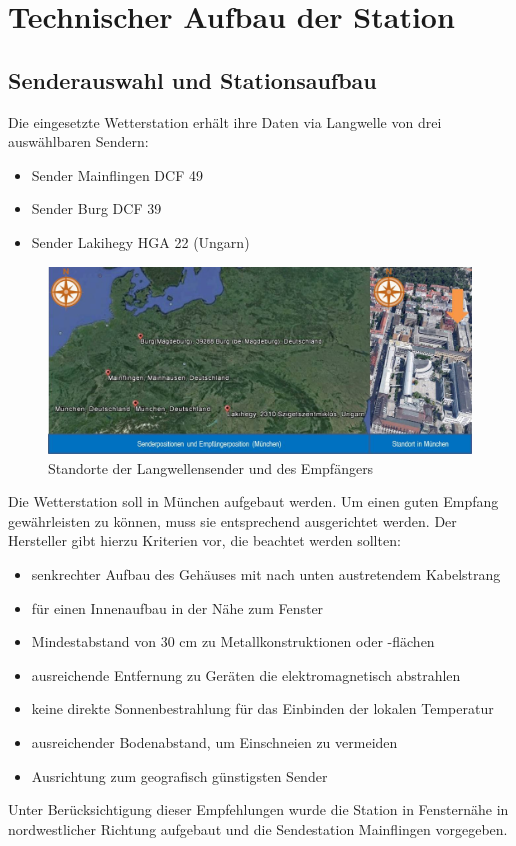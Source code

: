 \section{Technischer Aufbau der Station}
\subsection{Senderauswahl und Stationsaufbau}
Die eingesetzte Wetterstation erhält ihre Daten via Langwelle von drei auswählbaren Sendern:
\begin{itemize}
\item Sender Mainflingen DCF 49
\item Sender Burg DCF 39
\item Sender Lakihegy HGA 22 (Ungarn)
\end{itemize}
\begin{figure}[h]
\centering
\includegraphics[scale=0.65]{weatherstation/Empfaengerausrichtung}
\caption{Standorte der Langwellensender und des Empfängers\cite[S. 15]{HKWDoc}}
\label{fig:3}
\end{figure}
Die Wetterstation soll in München aufgebaut werden. Um einen guten Empfang gewährleisten zu können, muss sie entsprechend ausgerichtet werden. Der Hersteller gibt hierzu Kriterien vor, die beachtet werden sollten\cite[S. 13 u. 15]{HKWDoc}:
\begin{itemize}
\item senkrechter Aufbau des Gehäuses mit nach unten austretendem Kabelstrang
\item für einen Innenaufbau in der Nähe zum Fenster
\item Mindestabstand von 30 cm zu Metallkonstruktionen oder -flächen
\item ausreichende Entfernung zu Geräten die elektromagnetisch abstrahlen
\item keine direkte Sonnenbestrahlung für das Einbinden der lokalen Temperatur
\item ausreichender Bodenabstand, um Einschneien zu vermeiden
\item Ausrichtung zum geografisch günstigsten Sender
\end{itemize} 
Unter Berücksichtigung dieser Empfehlungen wurde die Station in Fensternähe in nordwestlicher Richtung aufgebaut und die Sendestation Mainflingen vorgegeben.
